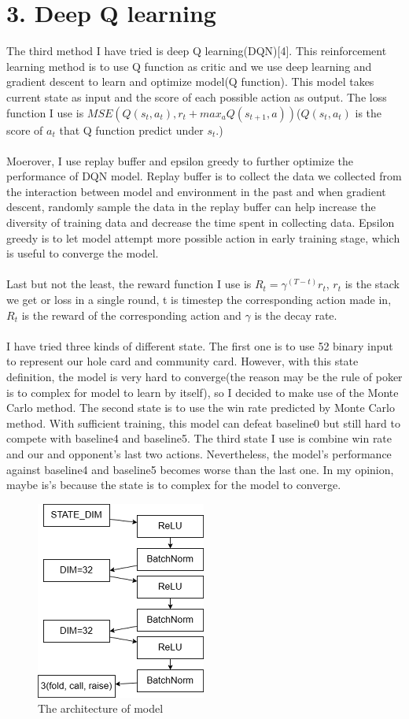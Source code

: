 \documentclass[11pt,a4paper]{article}
\begin{document}
\section*{3. Deep Q learning}
The third method I have tried is deep Q learning(DQN)[4]. This reinforcement learning method is to use Q function as critic and we use deep learning and gradient descent to
learn and optimize model(Q function). This model takes current state as input and the score of each possible action as output. The loss function I use is
$MSE(Q(s_t, a_t),r_t+max_aQ(s_{t+1},a))$($Q(s_t,a_t)$ is the score of $a_t$ that Q function predict under $s_t$.)\\
\\
Moerover, I use replay buffer and epsilon greedy to further optimize the performance of DQN model. Replay buffer is to collect the data we collected from the interaction between
model and environment in the past and when gradient descent, randomly sample the data in the replay buffer can help increase the diversity of training data and decrease
the time spent in collecting data. Epsilon greedy is to let model attempt more possible action in early training stage, which is useful to converge the model.\\
\\
Last but not the least, the reward function I use is $R_t=\gamma^{(T-t)}r_t$, $r_t$ is the stack we get or loss in a single round, t is timestep the corresponding action made in,
$R_t$ is the reward of the corresponding action and $\gamma$ is the decay rate.\\
\\
I have tried three kinds of different state. The first one is to use 52 binary input to represent our hole card and community card. However, with this state definition,
the model is very hard to converge(the reason may be the rule of poker is to complex for model to learn by itself), so I decided to make use of the Monte Carlo method.
The second state is to use the win rate predicted by Monte Carlo method. With sufficient training, this model can defeat baseline0 but still hard to compete with baseline4 and
baseline5. The third state I use is combine win rate and our and opponent's last two actions. Nevertheless, the model's performance against baseline4 and baseline5 becomes
worse than the last one. In my opinion, maybe is's because the state is to complex for the model to converge.\\
\begin{figure}[h!]
    \centering
    \includegraphics*{3-1.drawio.png}
    \caption{The architecture of model}
    \label{fig:arch}
\end{figure}
\end{document}

